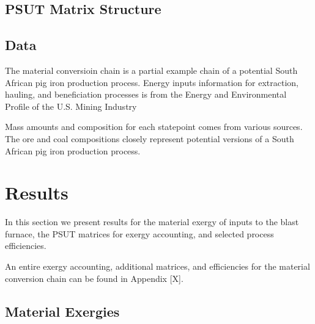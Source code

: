 \documentclass[energies,article,submit,pdftex,moreauthors]{Definitions/mdpi}
\begin{document}
\subsection{PSUT Matrix Structure}
\label{ssec: psut matrices}




\subsection{Data}
\label{ssec: data}

The material conversioin chain is a partial example chain
of a potential South African pig iron production process.
Energy inputs information
for extraction, hauling, and beneficiation processes
is from the Energy and Environmental Profile of the U.S. Mining Industry

Mass amounts and composition
for each statepoint
comes from various sources.
The ore and coal compositions closely represent potential versions
of a South African pig iron production process.


\section{Results}
\label{sec:results}

In this section we present results
for the material exergy
of inputs to the blast furnace,
the PSUT matrices for exergy accounting,
and selected process efficiencies.

An entire exergy accounting,
additional matrices,
and efficiencies
for the material conversion chain
can be found in Appendix [X].

\subsection{Material Exergies}
\label{ssec: blast furnace example}
\end{document}
